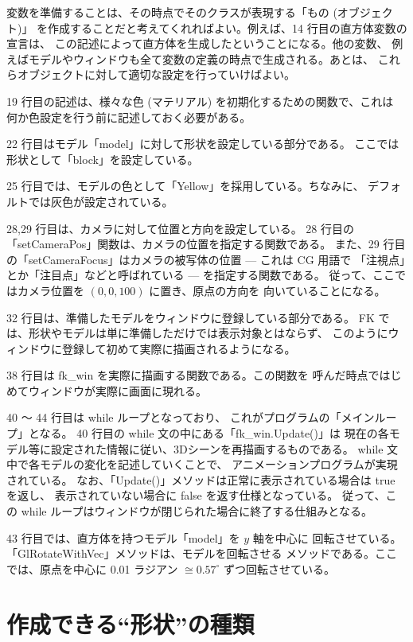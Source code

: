 変数を準備することは、その時点でそのクラスが表現する「もの (オブジェクト)」
を作成することだと考えてくれればよい。例えば、14 行目の直方体変数の宣言は、
この記述によって直方体を生成したということになる。他の変数、
例えばモデルやウィンドウも全て変数の定義の時点で生成される。あとは、
これらオブジェクトに対して適切な設定を行っていけばよい。

19 行目の記述は、様々な色 (マテリアル) を初期化するための関数で、これは
何か色設定を行う前に記述しておく必要がある。

22 行目はモデル「model」に対して形状を設定している部分である。
ここでは形状として「block」を設定している。

25 行目では、モデルの色として「Yellow」を採用している。ちなみに、
デフォルトでは灰色が設定されている。

28,29 行目は、カメラに対して位置と方向を設定している。
28 行目の「setCameraPos」関数は、カメラの位置を指定する関数である。
また、29 行目の「setCameraFocus」はカメラの被写体の位置 --- これは CG 用語で
「注視点」とか「注目点」などと呼ばれている --- を指定する関数である。
従って、ここではカメラ位置を \((0, 0, 100)\) に置き、原点の方向を
向いていることになる。

32 行目は、準備したモデルをウィンドウに登録している部分である。
FK では、形状やモデルは単に準備しただけでは表示対象とはならず、
このようにウィンドウに登録して初めて実際に描画されるようになる。

38 行目は fk\_win を実際に描画する関数である。この関数を
呼んだ時点ではじめてウィンドウが実際に画面に現れる。

40 〜 44 行目は while ループとなっており、
これがプログラムの「メインループ」となる。
40 行目の while 文の中にある「fk\_win.Update()」は
現在の各モデル等に設定された情報に従い、3Dシーンを再描画するものである。
while 文中で各モデルの変化を記述していくことで、
アニメーションプログラムが実現されている。
なお、「Update()」メソッドは正常に表示されている場合は true を返し、
表示されていない場合に false を返す仕様となっている。
従って、この while ループはウィンドウが閉じられた場合に終了する仕組みとなる。

43 行目では、直方体を持つモデル「model」を \(y\) 軸を中心に
回転させている。「GlRotateWithVec」メソッドは、モデルを回転させる
メソッドである。ここでは、原点を中心に 0.01 ラジアン \(\cong 0.57^\circ\)
ずつ回転させている。

\section{作成できる``形状''の種類}

